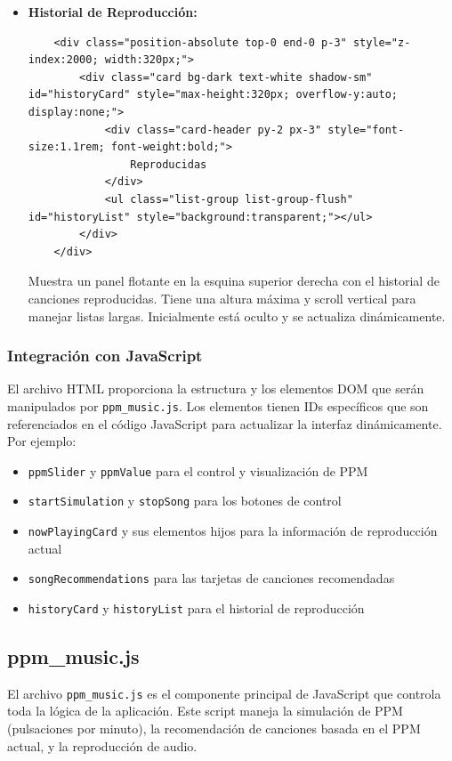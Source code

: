 \documentclass[a4paper,12pt]{article}
\begin{document}
\begin{itemize}
    \item \textbf{Historial de Reproducción:}
    \begin{verbatim}
    <div class="position-absolute top-0 end-0 p-3" style="z-index:2000; width:320px;">
        <div class="card bg-dark text-white shadow-sm" id="historyCard" style="max-height:320px; overflow-y:auto; display:none;">
            <div class="card-header py-2 px-3" style="font-size:1.1rem; font-weight:bold;">
                Reproducidas
            </div>
            <ul class="list-group list-group-flush" id="historyList" style="background:transparent;"></ul>
        </div>
    </div>
    \end{verbatim}
    Muestra un panel flotante en la esquina superior derecha con el historial de canciones reproducidas. Tiene una altura máxima y scroll vertical para manejar listas largas. Inicialmente está oculto y se actualiza dinámicamente.
\end{itemize}

\subsubsection{Integración con JavaScript}
El archivo HTML proporciona la estructura y los elementos DOM que serán manipulados por \texttt{ppm\_music.js}. Los elementos tienen IDs específicos que son referenciados en el código JavaScript para actualizar la interfaz dinámicamente. Por ejemplo:
\begin{itemize}
    \item \texttt{ppmSlider} y \texttt{ppmValue} para el control y visualización de PPM
    \item \texttt{startSimulation} y \texttt{stopSong} para los botones de control
    \item \texttt{nowPlayingCard} y sus elementos hijos para la información de reproducción actual
    \item \texttt{songRecommendations} para las tarjetas de canciones recomendadas
    \item \texttt{historyCard} y \texttt{historyList} para el historial de reproducción
\end{itemize}

\subsection{ppm\_music.js}
El archivo \texttt{ppm\_music.js} es el componente principal de JavaScript que controla toda la lógica de la aplicación. Este script maneja la simulación de PPM (pulsaciones por minuto), la recomendación de canciones basada en el PPM actual, y la reproducción de audio.
\end{document}
